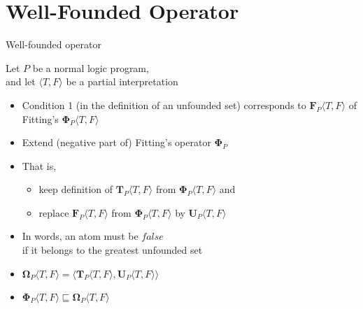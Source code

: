 \section{Well-Founded Operator}
\begin{frame}{Well-founded operator}

  Let $P$ be a normal logic program,\\
  and let $\langle T,F \rangle$ be a partial interpretation

  \begin{itemize}
  \item<1-> 
    Condition 1 (in the definition of an unfounded set)
    corresponds to  ${\mathbf{F}}_P\langle T,F \rangle$
    of Fitting's ${\mathbf{\Phi}}_P\langle T,F \rangle$
  \item<2-> 
    Extend (negative part of) Fitting's operator $\mathbf{\Phi}_P$

  \item<3-> [] That is,
    \begin{itemize}
    \item keep definition of ${\mathbf{T}}_P\langle T,F \rangle$ from ${\mathbf{\Phi}}_P\langle T,F \rangle$ and
    \item replace ${\mathbf{F}}_P\langle T,F \rangle$ from ${\mathbf{\Phi}}_P\langle T,F \rangle$ by
      ${\mathbf{U}}_P\langle T,F \rangle$
    \end{itemize}
  \item<4-> In words, an atom must be $\mathit{false}$\\ if it belongs to the greatest unfounded set
    \bigskip
  \item<5-> 
    \(
    {\mathbf{\Omega}}_P\langle T,F \rangle
    =
    \langle {\mathbf{T}}_P\langle T,F \rangle, {\mathbf{U}}_P\langle T,F \rangle\rangle
    \)
    \pause
  \item<5-> 
    \(
    {\mathbf{\Phi}}_P\langle T,F \rangle \sqsubseteq
    {\mathbf{\Omega}}_P\langle T,F \rangle
    \)
  \end{itemize}
\end{frame}
